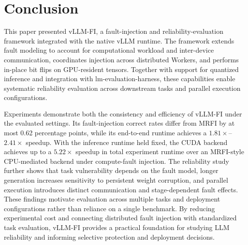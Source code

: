 \section{Conclusion}
\label{sec:conclusion}

This paper presented vLLM-FI, a fault-injection and reliability-evaluation framework integrated with the native vLLM runtime. The framework extends fault modeling to account for computational workload and inter-device communication, coordinates injection across distributed Workers, and performs in-place bit flips on GPU-resident tensors. Together with support for quantized inference and integration with lm-evaluation-harness, these capabilities enable systematic reliability evaluation across downstream tasks and parallel execution configurations.

Experiments demonstrate both the consistency and efficiency of vLLM-FI under the evaluated settings. Its fault-injection correct rates differ from MRFI by at most 0.62 percentage points, while its end-to-end runtime achieves a $1.81\times$--$2.41\times$ speedup. With the inference runtime held fixed, the CUDA backend achieves up to a $5.22\times$ speedup in total experiment runtime over an MRFI-style CPU-mediated backend under compute-fault injection. The reliability study further shows that task vulnerability depends on the fault model, longer generation increases sensitivity to persistent weight corruption, and parallel execution introduces distinct communication and stage-dependent fault effects. These findings motivate evaluation across multiple tasks and deployment configurations rather than reliance on a single benchmark. By reducing experimental cost and connecting distributed fault injection with standardized task evaluation, vLLM-FI provides a practical foundation for studying LLM reliability and informing selective protection and deployment decisions.
